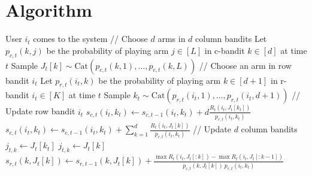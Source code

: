
\section{Algorithm}
\label{sec:algorithm}

\begin{algorithm}
  \begin{algorithmic}[1]
      \State User $i_t$ comes to the system
      \State
      \State // Choose $d$ arms in $d$ column bandits
      \State Let $p_{c, t}(k, j)$ be the probability of playing arm $j \in [L]$ in c-bandit $k \in [d]$ at time $t$
        \State Sample $J_t[k] \sim \mathrm{Cat}(p_{c, t}(k, 1), \dots, p_{c, t}(k, L))$
      \EndFor
      \State
      \State // Choose an arm in row bandit $i_t$
      \State Let $p_{r, t}(i_t, k)$ be the probability of playing arm $k \in [d + 1]$ in r-bandit $i_t \in [K]$ at time $t$
      \State Sample $k_t \sim \mathrm{Cat}(p_{r, t}(i_t, 1), \dots, p_{r, t}(i_t, d + 1))$
      \State
      \State // Update row bandit $i_t$
        \State $\displaystyle s_{c, t}(i_t, k_t) \gets s_{c, t - 1}(i_t, k_t) + d \frac{R_t(i_t, J_t[k_t])}{p_{r, t}(i_t, k_t)}$
      \Else
        \State $\displaystyle s_{c, t}(i_t, k_t) \gets s_{c, t - 1}(i_t, k_t) + \sum_{k = 1}^d \frac{R_t(i_t, J_t[k])}{p_{r, t}(i_t, k_t)}$
      \EndIf
      \State
      \State // Update $d$ column bandits
          \State $j_{t, k} \gets J_t[k_t]$
        \EndFor
      \Else
          \State $j_{t, k} \gets J_t[k]$
        \EndFor
          \State $\displaystyle
          s_{r, t}(k, J_t[k]) \gets s_{r, t - 1}(k, J_t[k]) +
          \frac{\max R_t(i_t, J_t[: k]) - \max R_t(i_t, J_t[: k - 1])}{p_{c, t}(k, J_t[k]) \ p_{r, t}(i_t, k_t)}$
        \EndFor
      \EndIf
    \EndFor
  \end{algorithmic}
\end{algorithm}

